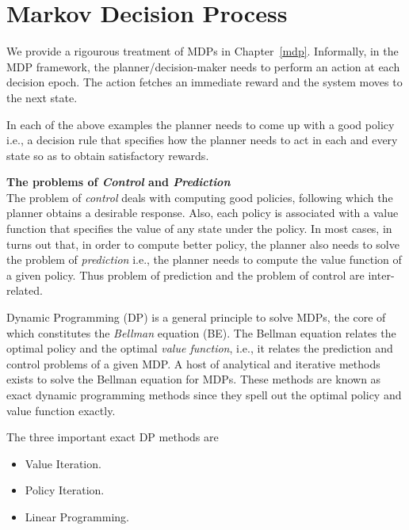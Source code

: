 \section {Markov Decision Process}
We provide a rigourous treatment of MDPs in Chapter~\ref{mdp}. Informally, in the MDP framework, the planner/decision-maker needs to perform an action at each decision epoch. The action fetches an immediate reward and the system moves to the next state.\par
In each of the above examples the planner needs to come up with a good policy i.e., a decision rule that specifies how the planner needs to act in each and every state so as to obtain satisfactory rewards. \par
\textbf{The problems of \emph{Control} and \emph{Prediction}}\\
The problem of \emph{control} deals with computing good policies, following which the planner obtains a desirable response. Also, each policy is associated with a value function that specifies the value of any state under the policy. In most cases, in turns out that, in order to compute better policy, the planner also needs to solve the problem of \emph{prediction} i.e., the planner needs to compute the value function of a given policy. Thus problem of prediction and the problem of control are inter-related.\par
Dynamic Programming (DP) is a general principle to solve MDPs, the core of which constitutes the \emph{Bellman} equation (BE). The Bellman equation relates the optimal policy and the optimal \emph{value function}, i.e., it relates the prediction and control problems of a given MDP. A host of analytical and iterative methods exists to solve the Bellman equation for MDPs. These methods are known as exact dynamic programming methods since they spell out the optimal policy and value function exactly.\par
The three important exact DP methods are 
\begin{itemize}
\item Value Iteration.
\item Policy Iteration.
\item Linear Programming.
\end{itemize}

